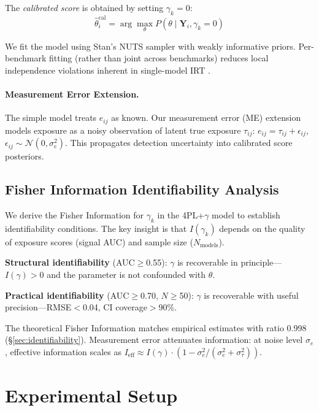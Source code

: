 \documentclass[11pt,a4paper]{article}
\begin{document}
The \emph{calibrated score} is obtained by setting $\gamma_k = 0$:
\begin{equation}
\hat{\theta}_i^{\text{cal}} = \arg\max_\theta P(\theta \mid \mathbf{Y}_i, \gamma_k = 0)
\end{equation}

We fit the model using Stan's NUTS sampler with weakly informative priors.
Per-benchmark fitting (rather than joint across benchmarks) reduces local independence violations inherent in single-model IRT \citep{mislevy1986recent}.

\paragraph{Measurement Error Extension.}
The simple model treats $e_{ij}$ as known.
Our measurement error (ME) extension models exposure as a noisy observation of latent true exposure $\tau_{ij}$:
$e_{ij} = \tau_{ij} + \epsilon_{ij}$, $\epsilon_{ij} \sim \mathcal{N}(0, \sigma_e^2)$.
This propagates detection uncertainty into calibrated score posteriors.

\subsection{Fisher Information Identifiability Analysis}
\label{sec:fisher}

We derive the Fisher Information for $\gamma_k$ in the 4PL+$\gamma$ model to establish identifiability conditions.
The key insight is that $I(\gamma_k)$ depends on the quality of exposure scores (signal AUC) and sample size ($N_\text{models}$).

\textbf{Structural identifiability} (AUC$\geq$0.55): $\gamma$ is recoverable in principle---$I(\gamma) > 0$ and the parameter is not confounded with $\theta$.

\textbf{Practical identifiability} (AUC$\geq$0.70, $N\geq$50): $\gamma$ is recoverable with useful precision---RMSE$<$0.04, CI coverage$>$90\%.

The theoretical Fisher Information matches empirical estimates with ratio 0.998 (\S\ref{sec:identifiability}).
Measurement error attenuates information: at noise level $\sigma_e$, effective information scales as $I_{\text{eff}} \approx I(\gamma) \cdot (1 - \sigma_e^2 / (\sigma_e^2 + \sigma_\tau^2))$.

\section{Experimental Setup}
\label{sec:setup}
\end{document}
